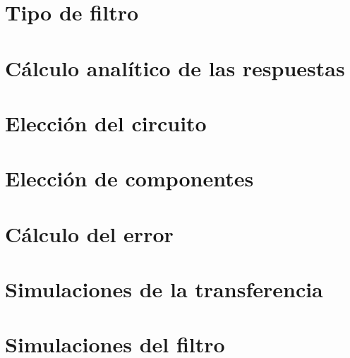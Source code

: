 \documentclass{estilo}
\begin{document}
\newpage

\tableofcontents

\newpage 



\newpage 

\hypertarget{ej1}{\section{Tipo de filtro}}


\hypertarget{ej2}{\section{Cálculo analítico de las respuestas}}


\hypertarget{ej3}{\section{Elección del circuito}}


\hypertarget{ej4}{\section{Elección de componentes}}


\hypertarget{ej5}{\section{Cálculo del error}}


\hypertarget{ej6}{\section{Simulaciones de la transferencia}}


\hypertarget{ej7}{\section{Simulaciones del filtro}}

\end{document}
